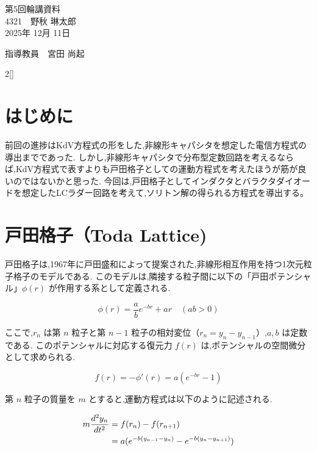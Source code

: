 \documentclass[a4paper,10pt]{article}
\begin{document}
\begin{center}
\noindent
{\LARGE 第5回輪講資料} \\
{\large 4321　野秋 琳太郎} \\
2025年 12月 11日
\end{center}

\begin{flushright}
指導教員　宮田 尚起
\end{flushright}    

\begin{multicols}{2}[\raggedcolumns]

\section{はじめに}
前回の進捗はKdV方程式の形をした,非線形キャパシタを想定した電信方程式の導出までであった.
しかし,非線形キャパシタで分布型定数回路を考えるならば,KdV方程式で表すよりも戸田格子としての運動方程式を考えたほうが筋が良いのではないかと思った.
今回は,戸田格子としてインダクタとバラクタダイオードを想定したLCラダー回路を考えて,ソリトン解の得られる方程式を導出する。


\section{戸田格子（Toda Lattice)}

戸田格子は,1967年に戸田盛和によって提案された,非線形相互作用を持つ1次元粒子格子のモデルである.
このモデルは,隣接する粒子間に以下の「戸田ポテンシャル」$\phi(r)$ が作用する系として定義される.

\begin{equation}
    \phi(r) = \frac{a}{b} e^{-br} + ar \quad (ab > 0)
\end{equation}

ここで,$r_n$ は第 $n$ 粒子と第 $n-1$ 粒子の相対変位（$r_n = y_n - y_{n-1}$）,$a, b$ は定数である.
このポテンシャルに対応する復元力 $f(r)$ は,ポテンシャルの空間微分として求められる.

\begin{equation}
    f(r) = -\phi'(r) = a (e^{-br} - 1)
\end{equation}

第 $n$ 粒子の質量を $m$ とすると,運動方程式は以下のように記述される.

\begin{align}
    m \frac{d^2 y_n}{dt^2} &= f(r_n) - f(r_{n+1}) \notag \\
    &= a(e^{-b(y_{n-1} - y_n)} - e^{-b(y_n - y_{n+1})})
\end{align}


\end{multicols}
\end{document}
